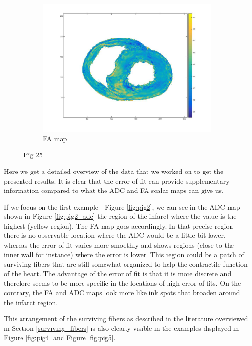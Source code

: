 \begin{figure}
\begin{subfigure}{.31\textwidth}
        \includegraphics[width=\textwidth]{figures/pig25_fa_30}
        \caption{FA map}
        \label{fig:pig25_fa}
    \end{subfigure}
    \caption{Pig 25}
    \label{fig:pig25}
\end{figure}

Here we get a detailed overview of the data that we worked on to get the presented results. It is clear that the error of fit can provide supplementary information compared to what the ADC and FA scalar maps can give us.

If we focus on the first example - Figure \ref{fig:pig2}, we can see in the ADC map shown in Figure \ref{fig:pig2_adc} the region of the infarct where the value is the highest (yellow region). The FA map goes accordingly. In that precise region there is no observable location where the ADC would be a little bit lower, whereas the error of fit varies more smoothly and shows regions (close to the inner wall for instance) where the error is lower. This region could be a patch of surviving fibers that are still somewhat organized to help the contractile function of the heart. The advantage of the error of fit is that it is more discrete and therefore seems to be more specific in the locations of high error of fits. On the contrary, the FA and ADC maps look more like ink spots that broaden around the infarct region.

This arrangement of the surviving fibers as described in the literature overviewed in Section \ref{surviving_fibers} is also clearly visible in the examples displayed in Figure \ref{fig:pig4} and Figure \ref{fig:pig5}.

